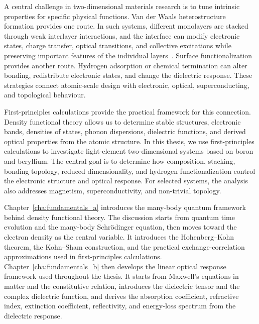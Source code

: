 A central challenge in two-dimensional materials research is to tune intrinsic properties for specific physical functions.
Van der Waals heterostructure formation provides one route.
In such systems, different monolayers are stacked through weak interlayer interactions, and the interface can modify electronic states, charge transfer, optical transitions, and collective excitations while preserving important features of the individual layers~\cite{novoselov20162d}.
Surface functionalization provides another route.
Hydrogen adsorption or chemical termination can alter bonding, redistribute electronic states, and change the dielectric response.
These strategies connect atomic-scale design with electronic, optical, superconducting, and topological behaviour.

First-principles calculations provide the practical framework for this connection.
Density functional theory allows us to determine stable structures, electronic bands, densities of states, phonon dispersions, dielectric functions, and derived optical properties from the atomic structure.
In this thesis, we use first-principles calculations to investigate light-element two-dimensional systems based on boron and beryllium.
The central goal is to determine how composition, stacking, bonding topology, reduced dimensionality, and hydrogen functionalization control the electronic structure and optical response.
For selected systems, the analysis also addresses magnetism, superconductivity, and non-trivial topology.

Chapter~\ref{cha:fundamentals_a} introduces the many-body quantum framework behind density functional theory.
The discussion starts from quantum time evolution and the many-body Schrödinger equation, then moves toward the electron density as the central variable.
It introduces the Hohenberg--Kohn theorem, the Kohn--Sham construction, and the practical exchange-correlation approximations used in first-principles calculations.
Chapter~\ref{cha:fundamentals_b} then develops the linear optical response framework used throughout the thesis.
It starts from Maxwell's equations in matter and the constitutive relation, introduces the dielectric tensor and the complex dielectric function, and derives the absorption coefficient, refractive index, extinction coefficient, reflectivity, and energy-loss spectrum from the dielectric response.

